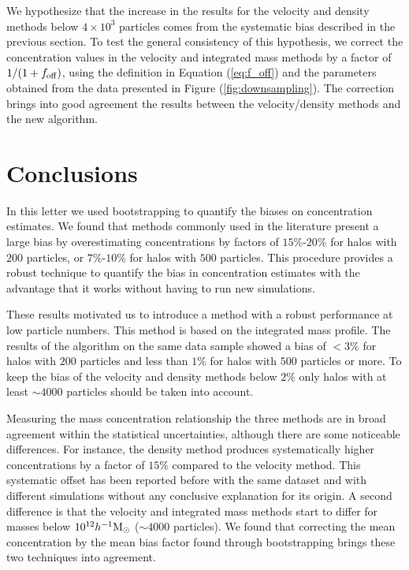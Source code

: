 \documentclass{emulateapj}
\newcommand{\hMsun}{{\ifmmode{h^{-1}{\rm {M_{\odot}}}}\else{$h^{-1}{\rm{M_{\odot}}}$}\fi}}
\begin{document}
We hypothesize that the increase in the results for the velocity
and density methods below $4\times 10^{3}$ particles comes from the
systematic bias described in the previous section.  
To test the general consistency of this hypothesis, we correct the
concentration values in the velocity and integrated mass methods by a
factor of $1/(1+f_{\rm  off})$, using the definition in Equation
(\ref{eq:f_off}) and the  
parameters obtained from the data presented in Figure
(\ref{fig:downsampling}).  
The correction brings into good agreement the results between the
velocity/density methods and the new algorithm.

\section{Conclusions}
\label{sec:conclusions}

In this letter we used bootstrapping to quantify the biases on
concentration estimates. 
We found that methods commonly used in the literature present a large
bias by overestimating concentrations by factors of $15\%$-$20\%$ for
halos with $200$ particles, or $7\%$-$10\%$ for halos with $500$
particles.  
This procedure provides a robust technique to quantify the bias in
concentration estimates with the advantage that it works without
having to run new simulations. 

These results motivated us to introduce a method with a robust
performance at low particle numbers.
This method is based on the integrated mass profile. 
The results of the algorithm on the same data sample showed a bias  of
$< 3\%$ for halos with $200$ particles and less than $1\%$ for halos
with $500$ particles or more.  
To keep the bias of the velocity and density methods below $2\%$ only halos
with at least $\sim 4000$ particles should be taken into account.

Measuring the mass concentration relationship the three methods are in
broad agreement within the statistical  uncertainties, although there
are some noticeable differences. 
For instance, the density method produces systematically higher
concentrations by a factor of $15\%$ compared to the velocity method.
This systematic offset has been reported before with the same dataset 
\citep{Prada2012} and with different simulations \citep{Klypin2016}
without any conclusive explanation for its origin. 
A second difference is that the velocity and integrated mass methods
start to differ for masses below $10^{12}\hMsun$ ($\sim 4000$
particles).   
We found that correcting the mean concentration by the mean bias
factor found through bootstrapping brings these two techniques into
agreement. 
\end{document}
